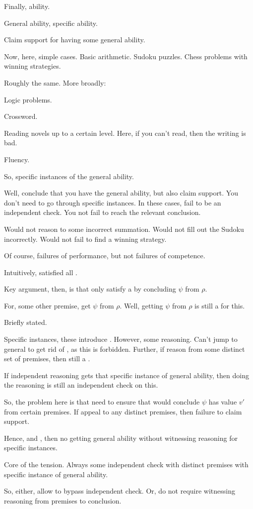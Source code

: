 \begin{note}
  Finally, ability.

  General ability, specific ability.

  Claim support for having some general ability.

  Now, here, simple cases.
  Basic arithmetic.
  Sudoku puzzles.
  Chess problems with winning strategies.

  Roughly the same.
  More broadly:

  Logic problems.

  Crossword.

  Reading novels up to a certain level.
  Here, if you can't read, then the writing is bad.

  Fluency.

  So, specific instances of the general ability.
\end{note}

\begin{note}
  Well, conclude that you have the general ability, but also claim support.
  You don't need to go through specific instances.
  In these cases, fail to be an independent check.
  You not fail to reach the relevant conclusion.

  Would not reason to some incorrect summation.
  Would not fill out the Sudoku incorrectly.
  Would not fail to find a winning strategy.

  Of course, failures of performance, but not failures of competence.

  Intuitively, satisfied all .
\end{note}


\begin{note}
  Key argument, then, is that only satisfy a \requ{} by concluding \(\psi\) from \(\rho\).

  For, some other premise, get \(\psi\) from \(\rho\).
  Well, getting \(\psi\) from \(\rho\) is still a \requ{} for this.
\end{note}

\begin{note}
  Briefly stated.

  Specific instances, these introduce \requ{}.
  However, some reasoning.
  Can't jump to general to get rid of \requ{}, as this is forbidden.
  Further, if reason from some distinct set of premises, then still a \requ{}.

  If independent reasoning gets that specific instance of general ability, then doing the reasoning is still an independent check on this.

  So, the problem here is that need to ensure that would conclude \(\psi\) has value \(v'\) from certain premises.
  If appeal to any distinct premises, then failure to claim support.

  Hence, \ESU{} and \ideaCS{}, then no getting general ability without witnessing reasoning for specific instances.

  Core of the tension.
  Always some independent check with distinct premises with specific instance of general ability.

  So, either, allow to bypass independent check.
  Or, do not require witnessing reasoning from premises to conclusion.
\end{note}

